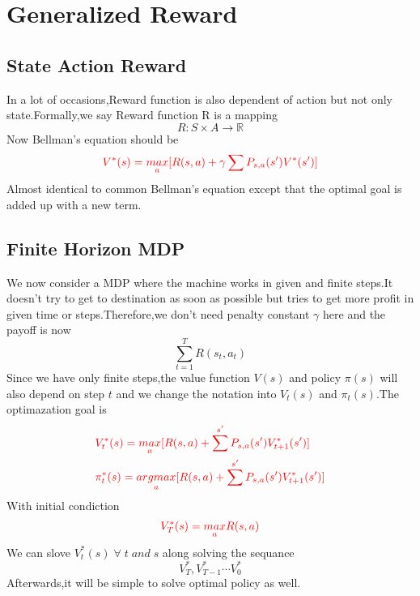 \documentclass{article}
\begin{document}
\section{Generalized Reward}
\subsection{State Action Reward}
In a lot of occasions,Reward function is also dependent of action but not only state.Formally,we say Reward function R is a mapping$$R:S\times A\rightarrow \mathbb{R}$$Now Bellman's equation should be$$\textcolor{red}{V^*(s)=\underset{a}{max}[R(s,a)+\gamma\sum P_{s,a}(s')V^*(s')]}$$Almost identical to common Bellman's equation except that the optimal goal is added up with a new term.
\subsection{Finite Horizon MDP}
We now consider a MDP where the machine works in given and finite steps.It doesn't try to get to destination as soon as possible but tries to get more profit in given time or steps.Therefore,we don't need penalty constant $\gamma$ here and the payoff is now$$\sum_{t=1}^{T}R(s_t,a_t)$$
Since we have only finite steps,the value function $V(s)$ and policy $\pi(s)$ will also depend on step $t$ and we change the notation into $V_t(s)$ and $\pi_t(s)$.The optimazation goal is
\begin{align*}
	&\textcolor{red}{V^*_t(s)=\underset{a}{max}[R(s,a)+\sum^{s'}P_{s,a}(s')V^*_{t+1}(s')]}\\
	&\textcolor{red}{\pi^*_t(s)=\underset{a}{argmax}[R(s,a)+\sum^{s'}P_{s,a}(s')V^*_{t+1}(s')]}
\end{align*}
With initial condiction$$\textcolor{red}{V^*_T(s)=\underset{a}{max}R(s,a)}$$We can slove $V^*_t(s)\;\forall\;t\;and\;s$ along solving the sequance$$V^*_T,V^*_{T-1}\cdots V^*_0$$Afterwards,it will be simple to solve optimal policy as well.
\end{document}
